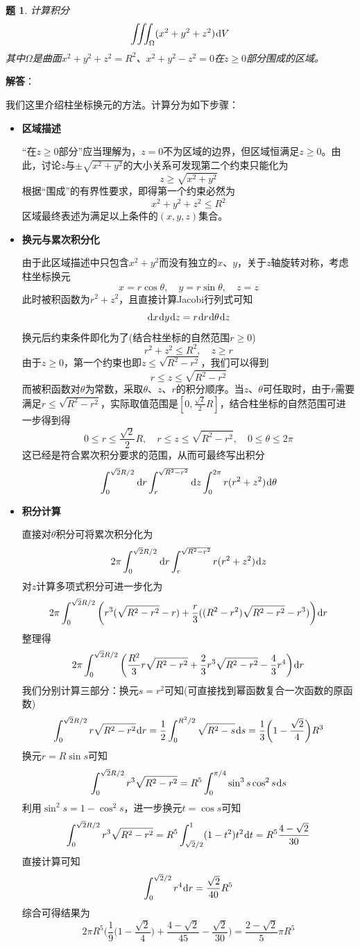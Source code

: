 \documentclass[a4paper,UTF8,fontset=windows,AutoFakeBold]{ctexart}
\newcommand*{\dr}{\hspace{0.07em}\mathrm{d}}
\theoremstyle{ex}
\newtheorem{exercise}{题}
\newcommand{\sol}[1]{{\vspace{5pt}\kaishu\noindent\textbf{解答}：\vspace{-3pt}
\begin{compactitem}
    \item[] #1
\end{compactitem}
}}
\begin{document}
\begin{framed}
\begin{exercise}
    计算积分
    $$\iiint_\Omega(x^2+y^2+z^2)\dr V$$
    其中$\Omega$是曲面$x^2+y^2+z^2=R^2$、$x^2+y^2-z^2=0$在$z\ge0$部分围成的区域。
\end{exercise}
\sol{
    我们这里介绍柱坐标换元的方法。计算分为如下步骤：
    \begin{itemize}
        \item \textbf{区域描述}
        
        ``在$z\ge0$部分''应当理解为，$z=0$不为区域的边界，但区域恒满足$z\ge0$。由此，讨论$z$与$\pm\sqrt{x^2+y^2}$的大小关系可发现第二个约束只能化为
        $$z\ge\sqrt{x^2+y^2}$$ 
        根据``围成''的有界性要求，即得第一个约束必然为
        $$x^2+y^2+z^2\le R^2$$
        区域最终表述为满足以上条件的$(x,y,z)$集合。

        \item \textbf{换元与累次积分化}
        
        由于此区域描述中只包含$x^2+y^2$而没有独立的$x$、$y$，关于$z$轴旋转对称，考虑柱坐标换元
        $$x=r\cos\theta,\quad y=r\sin\theta,\quad z=z$$
        此时被积函数为$r^2+z^2$，且直接计算Jacobi行列式可知
        $$\dr x\dr y\dr z=r\dr r\dr\theta\dr z$$
        换元后约束条件即化为了(结合柱坐标的自然范围$r\ge0$)
        $$r^2+z^2\le R^2,\quad z\ge r$$
        由于$z\ge0$，第一个约束也即$z\le\sqrt{R^2-r^2}$，我们可以得到
        $$r\le z\le\sqrt{R^2-r^2}$$
        而被积函数对$\theta$为常数，采取$\theta$、$z$、$r$的积分顺序。当$z$、$\theta$可任取时，由于$r$需要满足$r\le\sqrt{R^2-r^2}$，实际取值范围是$[0,\frac{\sqrt2}{2}R]$，结合柱坐标的自然范围可进一步得到得
        $$0\le r\le\frac{\sqrt2}{2}R,\quad r\le z\le\sqrt{R^2-r^2},\quad 0\le\theta\le 2\pi$$
        这已经是符合累次积分要求的范围，从而可最终写出积分
        $$\int_0^{\sqrt2R/2}\dr r\int_r^{\sqrt{R^2-r^2}}\dr z\int_0^{2\pi}r(r^2+z^2)\dr\theta$$

        \item \textbf{积分计算}
        
        直接对$\theta$积分可将累次积分化为
        $$2\pi\int_0^{\sqrt2R/2}\dr r\int_r^{\sqrt{R^2-r^2}}r(r^2+z^2)\dr z$$
        对$z$计算多项式积分可进一步化为
        $$2\pi\int_0^{\sqrt2R/2}\bigg(r^3(\sqrt{R^2-r^2}-r)+\frac{r}{3}((R^2-r^2)\sqrt{R^2-r^2}-r^3)\bigg)\dr r$$
        整理得
        $$2\pi\int_0^{\sqrt2R/2}\bigg(\frac{R^2}{3}r\sqrt{R^2-r^2}+\frac{2}{3}r^3\sqrt{R^2-r^2}-\frac{4}{3}r^4\bigg)\dr r$$
        我们分别计算三部分：换元$s=r^2$可知(可直接找到幂函数复合一次函数的原函数)
        $$\int_0^{\sqrt2R/2}r\sqrt{R^2-r^2}\dr r=\frac{1}{2}\int_0^{R^2/2}\sqrt{R^2-s}\dr s=\frac{1}{3}\bigg(1-\frac{\sqrt2}{4}\bigg)R^3$$
        换元$r=R\sin s$可知
        $$\int_0^{\sqrt2R/2}r^3\sqrt{R^2-r^2}=R^5\int_0^{\pi/4}\sin^3s\cos^2s\dr s$$
        利用$\sin^2s=1-\cos^2s$，进一步换元$t=\cos s$可知
        $$\int_0^{\sqrt2R/2}r^3\sqrt{R^2-r^2}=R^5\int_{\sqrt2/2}^1(1-t^2)t^2\dr t=R^5\frac{4-\sqrt{2}}{30}$$
        直接计算可知
        $$\int_0^{\sqrt2/2}r^4\dr r=\frac{\sqrt2}{40}R^5$$
        综合可得结果为
        $$2\pi R^5\bigg(\frac{1}{9}\bigg(1-\frac{\sqrt2}{4}\bigg)+\frac{4-\sqrt{2}}{45}-\frac{\sqrt2}{30}\bigg)=\frac{2-\sqrt2}{5}\pi R^5$$
    \end{itemize}

}
\end{framed}
\end{document}
